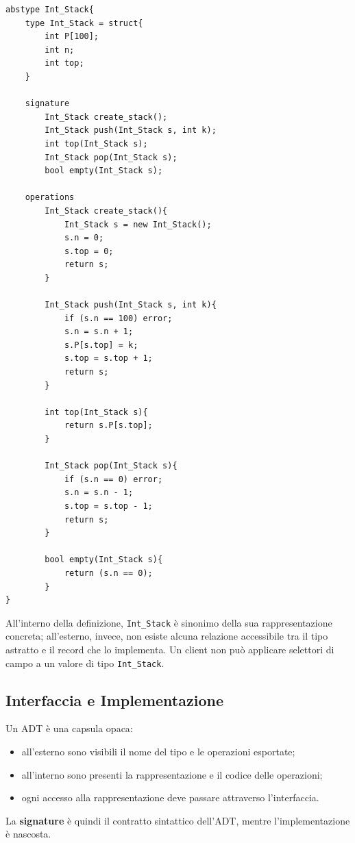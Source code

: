 \documentclass{article}
\begin{document}
\begin{lstlisting}
abstype Int_Stack{
    type Int_Stack = struct{
        int P[100];
        int n;
        int top;
    }

    signature
        Int_Stack create_stack();
        Int_Stack push(Int_Stack s, int k);
        int top(Int_Stack s);
        Int_Stack pop(Int_Stack s);
        bool empty(Int_Stack s);

    operations
        Int_Stack create_stack(){
            Int_Stack s = new Int_Stack();
            s.n = 0;
            s.top = 0;
            return s;
        }

        Int_Stack push(Int_Stack s, int k){
            if (s.n == 100) error;
            s.n = s.n + 1;
            s.P[s.top] = k;
            s.top = s.top + 1;
            return s;
        }

        int top(Int_Stack s){
            return s.P[s.top];
        }

        Int_Stack pop(Int_Stack s){
            if (s.n == 0) error;
            s.n = s.n - 1;
            s.top = s.top - 1;
            return s;
        }

        bool empty(Int_Stack s){
            return (s.n == 0);
        }
}
\end{lstlisting}

All'interno della definizione, \texttt{Int\_Stack} è sinonimo della sua rappresentazione concreta; all'esterno, invece, non esiste alcuna relazione accessibile tra il tipo astratto e il record che lo implementa. Un client non può applicare selettori di campo a un valore di tipo \texttt{Int\_Stack}.

\subsection{Interfaccia e Implementazione}

Un ADT è una capsula opaca:
\begin{itemize}
  \item all'esterno sono visibili il nome del tipo e le operazioni esportate;
  \item all'interno sono presenti la rappresentazione e il codice delle operazioni;
  \item ogni accesso alla rappresentazione deve passare attraverso l'interfaccia.
\end{itemize}

La \textbf{signature} è quindi il contratto sintattico dell'ADT, mentre l'implementazione è nascosta.
\end{document}
